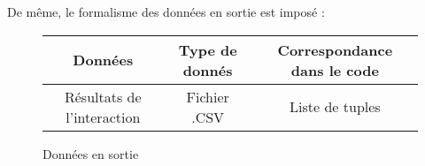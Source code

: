 \noindent De même, le formalisme des données en sortie est imposé :

\renewcommand{\arraystretch}{1.4}
\begin{figure}[!h]
	\begin{center}
		\begin{tabular}{|c|c|c|}
			\hline
			Données & Type de donnés & Correspondance dans le code \\
			\hline
			Résultats de l'interaction & Fichier .CSV & Liste de tuples \\
			\hline
		\end{tabular}
	\end{center}
	\caption[Données en sortie]{Données en sortie}
	\label{tab:datasortie}
\end{figure}
